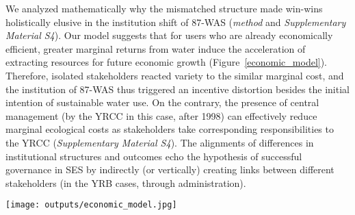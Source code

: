 We analyzed mathematically why the mismatched structure made win-wins holistically elusive in the institution shift of 87-WAS (\textit{method} and \textit{Supplementary Material S4}).
Our model suggests that for users who are already economically efficient, greater marginal returns from water induce the acceleration of extracting resources for future economic growth (Figure~\ref{economic_model}).
Therefore, isolated stakeholders reacted variety to the similar marginal cost, and the institution of 87-WAS thus triggered an incentive distortion besides the initial intention of sustainable water use.
On the contrary, the presence of central management (by the YRCC in this case, after 1998) can effectively reduce marginal ecological costs as stakeholders take corresponding responsibilities to the YRCC (\textit{Supplementary Material S4}).
The alignments of differences in institutional structures and outcomes echo the hypothesis of successful governance in SES by indirectly (or vertically) creating links between different stakeholders (in the YRB cases, through administration).

\begin{figure*}[!ht]
    \centering
    \texttt{[image: outputs/economic\_model.jpg]}
	\caption{
		\textbf{A.} The relationship of marginal benefits and water use of province i at t = 0 for three different cases (case 1 to case 3, corresponding to the different SES structures in Figure~\ref{structure}, assuming $F(x)=ln(1+x)$, $N=8$, $P=1$, $C=0.5$, and $\beta=0.4$ as an example  (see \textit{Methods}In Case 3, water use by others is taken as a given, equal to the optimal water use for Case 2. The horizontal coordinate of each intersection of marginal benefits and the break-even line represents the optimal water use under each case.
		\textbf{Panel B.} The relation between optimal water use of province i and total quota for Case 3, under time horizon of $T=5$, $T=10$, and an infinite $T$, respectively. The settings are the same as in \textbf{A}.
	}
	\label{economic_model}
\end{figure*}



